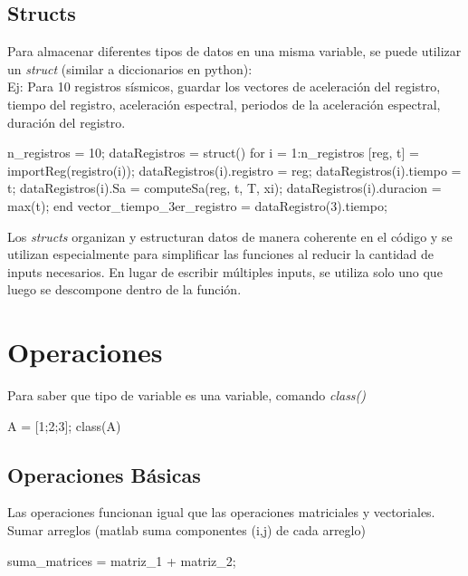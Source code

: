 \subsection{Structs}
Para almacenar diferentes tipos de datos en una misma variable, se puede utilizar un \emph{struct} (similar a diccionarios en python):\\

Ej: Para 10 registros sísmicos, guardar los vectores de aceleración del registro, tiempo del registro, aceleración espectral, periodos de la aceleración espectral, duración del registro. 
\begin{verbatimg}
    n_registros = 10;
    dataRegistros = struct()                %
    for i =  1:n_registros                  %
        [reg, t] = importReg(registro(i));  %
        dataRegistros(i).registro = reg;
        dataRegistros(i).tiempo = t;
        dataRegistros(i).Sa = computeSa(reg, t, T, xi);
        dataRegistros(i).duracion = max(t); %
    end
    vector_tiempo_3er_registro = dataRegistro(3).tiempo;
\end{verbatimg}

\noindent Los \emph{structs} organizan y estructuran datos de manera coherente en el código y se utilizan especialmente para simplificar las funciones al reducir la cantidad de inputs necesarios. En lugar de escribir múltiples inputs, se utiliza solo uno que luego se descompone dentro de la función.

\section{Operaciones}
Para saber que tipo de variable es una variable, comando \emph{class()}
\begin{verbatimg}
    A = [1;2;3];
    class(A)  %
\end{verbatimg}

\subsection{Operaciones Básicas}
Las operaciones funcionan igual que las operaciones matriciales y vectoriales. \\

Sumar arreglos (matlab suma componentes (i,j) de cada arreglo)
\begin{verbatimg}
    suma_matrices = matriz_1 + matriz_2;
\end{verbatimg}


